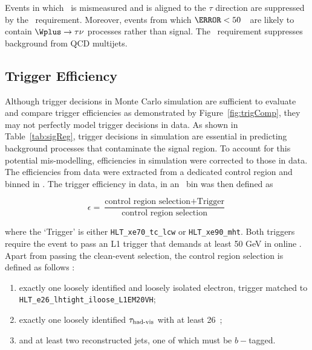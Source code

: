 Events in which \met\ is mismeasured and is aligned to the $\tau$ direction are suppressed by the \mT\ 
requirement. Moreover, events from which $\mT<50$~\GeV\ are likely to contain $\Wplus\to\tau\nu$ processes rather 
than signal. The \met\ requirement suppresses background from QCD multijets. 


\subsection{Trigger Efficiency}
\par Although trigger decisions in Monte Carlo simulation are sufficient to evaluate and compare trigger 
efficiencies as demonstrated by Figure~\ref{fig:trigComp}, they may not perfectly model trigger decisions 
in data. As shown in Table~\ref{tab:sigReg}, trigger decisions in simulation are essential in predicting background 
processes that contaminate the signal region. To account for this potential mis-modelling, 
efficiencies in simulation were corrected to those in data. The efficiencies from data 
were extracted from a dedicated control region and binned in \met. The trigger 
efficiency in data, in an \met\ bin was then defined as 

\begin{equation}
\epsilon = \frac{\text{control region selection} + \text{Trigger}}{\text{control region selection}}
\end{equation}  

where the `Trigger' is either \texttt{HLT\_xe70\_tc\_lcw} or \texttt{HLT\_xe90\_mht}. Both triggers require the 
event to pass an L1 trigger that demands at least 50 GeV in online \met. Apart from passing 
the clean-event selection, the control region selection is defined as follows :
\begin{enumerate}
\item exactly one loosely identified and loosely isolated electron, trigger matched to \\ \texttt{HLT\_e26\_lhtight\_iloose\_L1EM20VH};
\item exactly one loosely identified $\tau_{\text{had-vis}}$ with at least 26~\GeV;
\item and at least two reconstructed jets, one of which must be $b-$tagged.
\end{enumerate} 

